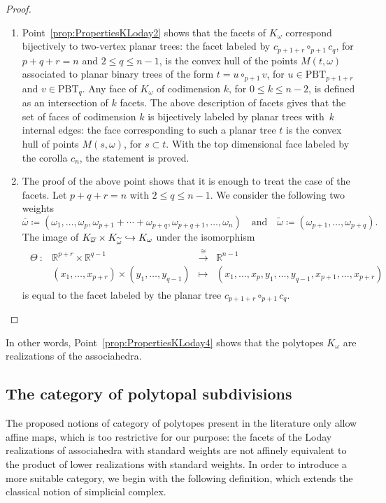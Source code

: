 \documentclass[JEP,XML,SOM,Unicode,NoFloatCountersInSection]{cedram}
\def\hto{\mathrel{\lhook\joinrel\to}}
\theoremstyle{plain}
\theoremstyle{definition}
\newcommand{\RR}{\mathbb{R}}
\newcommand{\K}{{K}}
\newcommand{\Tam}[1]{\mathrm{PBT}_{#1}}
\begin{document}
\begin{proof}
\begin{enumerate}
\item Point~\eqref{prop:PropertiesKLoday2} shows that the facets of $\K_\omega$ correspond bijectively to two-vertex planar trees: the facet labeled by
$c_{p+1+r}\circ_{p+1} c_q$, for $p+q+r=n$ and $2\leq q \leq n-1$, is the convex hull of the points $M(t, \omega)$ associated to planar binary trees of the form $t=u\circ_{p+1} v$, for $u\in\Tam{p+1+r}$ and $v\in \Tam{q}$.
Any face of $\K_\omega$ of codimension $k$, for
$0\leq k \leq n-2$, is defined as an intersection of $k$ facets. The above description of facets gives that the set of faces of codimension $k$ is bijectively labeled by planar trees with~$k$ internal edges: the face corresponding to such a planar tree $t$ is the convex hull of points $M(s, \omega)$, for $s\subset t$. With the top dimensional face labeled by the corolla $c_n$, the statement is proved.

\item The proof of the above point shows that it is enough to treat the case of the facets.
Let $p+q+r=n$ with $2\leq q \leq n-1$. We consider the following two weights
\[
\overline{\omega}\coloneqq (\omega_1, \ldots, \omega_{p}, \omega_{p+1}+\cdots+\omega_{p+q}, \omega_{p+q+1}, \ldots, \omega_{n})
\quad \text{and} \quad
\widetilde{\omega}\coloneqq (\omega_{p+1}, \ldots, \omega_{p+q}).
\]
The image of $\K_{\overline{\omega}}\times \K_{\widetilde{\omega}}\hto \K_\omega$ under the isomorphism
\begin{align*}
\begin{array}{rccc}
\Theta\ : & \RR^{p+r}\times \RR^{q-1} &\xrightarrow{~\cong~} &\RR^{n-1}\\
&(x_1, \ldots, x_{p+r})\times (y_1, \ldots, y_{q-1}) & \longmapsto&
(x_1, \ldots, x_{p}, y_1, \ldots, y_{q-1}, x_{p+1}, \ldots, x_{p+r})
\end{array}
\end{align*}
is equal to the facet labeled by the planar tree $c_{p+1+r}\circ_{p+1} c_q$.\qedhere
\end{enumerate}
\end{proof}

In other words, Point~\eqref{prop:PropertiesKLoday4} shows that the polytopes $\K_\omega$ are realizations of the associahedra.

\subsection{The category of polytopal subdivisions}
The proposed notions of category of polytopes present in the literature only allow affine maps, which is too restrictive for our purpose: the facets of the Loday realizations of associahedra with standard weights are not affinely equivalent to the product of lower realizations with standard weights. In order to introduce a more suitable category, we begin with the following definition, which extends the classical notion of simplicial complex.
\end{document}
